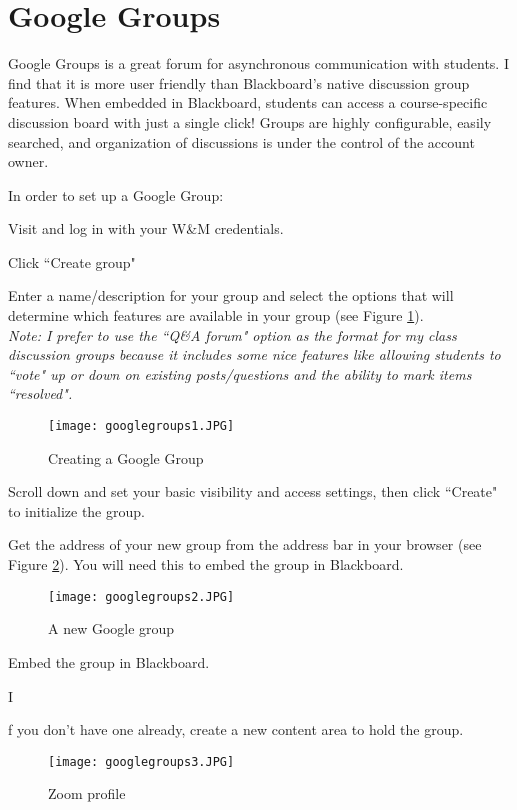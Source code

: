 \newpage
\newcommand{\SubItem}[1]{
    {\setlength\itemindent{15pt} \item[-] #1}
}

\section{Google Groups}
Google Groups is a great forum for asynchronous communication with students. I find that it is more user friendly than Blackboard's native discussion group features.  When embedded in Blackboard, students can access a course-specific discussion board with just a single click!  Groups are highly configurable, easily searched, and organization of discussions is under the control of the account owner.

In order to set up a Google Group:
\begin{enumerate}
    \item Visit  and log in with your W\&M credentials.
    \item Click ``Create group"
    \item Enter a name/description for your group and select the options that will determine which features are available in your group (see Figure \ref{fig:googlegroup1}).\\
    \textit{Note: I prefer to use the ``Q\&A forum" option as the format for my class discussion groups because it includes some nice features like allowing students to ``vote" up or down on existing posts/questions and the ability to mark items ``resolved".}
    \begin{figure}[ht]
    \centering\texttt{[image: googlegroups1.JPG]}
    \caption{Creating a Google Group}
    \label{fig:googlegroup1}
    \end{figure}
    
    \item Scroll down and set your basic visibility and access settings, then click ``Create" to initialize the group.
    \newpage
    \item Get the address of your new group from the address bar in your browser (see Figure \ref{fig:googlegroups2}). You will need this to embed the group in Blackboard.
    \begin{figure}[h]
    \centering\texttt{[image: googlegroups2.JPG]}
    \caption{A new Google group}
    \label{fig:googlegroups2}
    \end{figure}
    
    \item Embed the group in Blackboard.
    \SubItem If you don't have one already, create a new content area to hold the group.
    \begin{figure}[h]
    \centering
    \centering\texttt{[image: googlegroups3.JPG]}
    \caption{Zoom profile}
    \label{fig:googlegroups3}
    \end{figure}
    

\end{enumerate}
